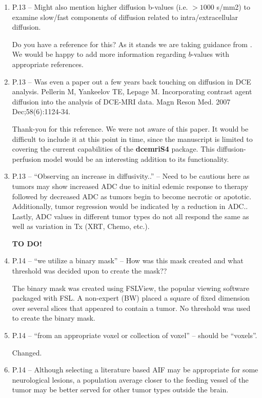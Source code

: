 \documentclass[11pt]{article}
\begin{document}
\begin{enumerate}
\item P.13 – Might also mention higher diffusion b-values
  (i.e. $>1000$ s/mm2) to examine slow/fast components of diffusion
  related to intra/extracellular diffusion.

  Do you have a reference for this?  As it stands we are taking
  guidance from \citet{pad-etal:neoplasia}.  We would be happy to add
  more information regarding $b$-values with appropriate references.

\item P.13 – Was even a paper out a few years back touching on
  diffusion in DCE analysis.  Pellerin M, Yankeelov TE, Lepage
  M. Incorporating contrast agent diffusion into the analysis of
  DCE-MRI data. Magn Reson Med. 2007 Dec;58(6):1124-34.

  Thank-you for this reference.  We were not aware of this paper.  It
  would be difficult to include it at this point in time, since the
  manuscript is limited to covering the current capabilities of the
  \textbf{dcemriS4} package.  This diffusion-perfusion model would be
  an interesting addition to its functionality.

\item P.13 – ``Observing an increase in diffusivity..'' – Need to be
  cautious here as tumors may show increased ADC due to initial edemic
  response to therapy followed by decreased ADC as tumors begin to
  become necrotic or apototic. Additionally, tumor regression would be
  indicated by a reduction in ADC.. Lastly, ADC values in different
  tumor types do not all respond the same as well as variation in Tx
  (XRT, Chemo, etc.).

  \textbf{TO DO!}  

\item P.14 – ``we utilize a binary mask'' – How was this mask created
  and what threshold was decided upon to create the mask??

  The binary mask was created using FSLView, the popular viewing
  software packaged with FSL.  A non-expert (BW) placed a square of
  fixed dimension over several slices that appeared to contain a
  tumor.  No threshold was used to create the binary mask.

\item P.14 – ``from an appropriate voxel or collection of voxel'' –
  should be ``voxels''.

  Changed.

\item P.14 – Although selecting a literature based AIF may be
  appropriate for some neurological lesions, a population average
  closer to the feeding vessel of the tumor may be better served for
  other tumor types outside the brain.


\end{enumerate}
\end{document}
